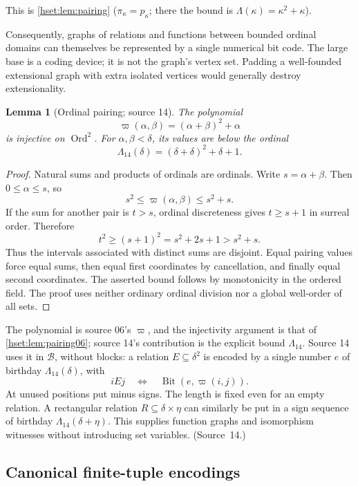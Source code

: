 \documentclass[11pt,letterpaper]{article}
\newtheorem{lemma}[lemma]{Lemma}\aliascntresetthe{lemma}
\theoremstyle{definition}
\theoremstyle{remark}
\newcommand{\Ord}{\operatorname{Ord}}
\newcommand{\B}{\mathcal B}
\newcommand{\Bit}{\operatorname{Bit}}
\begin{document}
This is \cref{hset:lem:pairing} ($\pi_\kappa=p_\kappa$; there the bound is
$\Lambda(\kappa)=\kappa^2+\kappa$).

Consequently, graphs of relations and functions between bounded ordinal domains
can themselves be represented by a single numerical bit code. The large base is a
coding device; it is not the graph's vertex set. Padding a well-founded
extensional graph with extra isolated vertices would generally destroy
extensionality.

\begin{lemma}[Ordinal pairing; source 14]\label{hset:sf:lem:pair}
The polynomial
\begin{equation}\label{hset:sf:eq:pair}
 \varpi(\alpha,\beta)=(\alpha+\beta)^2+\alpha
\end{equation}
is injective on $\Ord^2$. For $\alpha,\beta<\delta$, its values are below the
ordinal
\[
 \Lambda_{14}(\delta)=(\delta+\delta)^2+\delta+1.
\]
\end{lemma}
\begin{proof}
Natural sums and products of ordinals are ordinals. Write $s=\alpha+\beta$. Then
$0\le\alpha\le s$, so
\[
 s^2\le\varpi(\alpha,\beta)\le s^2+s.
\]
If the sum for another pair is $t>s$, ordinal discreteness gives $t\ge s+1$ in
surreal order. Therefore
\[
 t^2\ge(s+1)^2=s^2+2s+1>s^2+s.
\]
Thus the intervals associated with distinct sums are disjoint. Equal pairing
values force equal sums, then equal first coordinates by cancellation, and finally
equal second coordinates. The asserted bound follows by monotonicity in the
ordered field. The proof uses neither ordinary ordinal division nor a global
well-order of all sets.
\end{proof}

The polynomial is source 06's $\varpi$, and the injectivity argument is that of
\cref{hset:lem:pairing06}; source 14's contribution is the explicit bound
$\Lambda_{14}$. Source 14 uses it in $\B$, without blocks: a relation
$E\subseteq\delta^2$ is encoded by a single number $e$ of birthday
$\Lambda_{14}(\delta)$, with
\[
 iEj\quad\Longleftrightarrow\quad\Bit(e,\varpi(i,j)).
\]
At unused positions put minus signs. The length is fixed even for an empty
relation. A rectangular relation $R\subseteq\delta\times\eta$ can similarly be
put in a sign sequence of birthday $\Lambda_{14}(\delta+\eta)$. This supplies
function graphs and isomorphism witnesses without introducing set variables.
(Source~14.)

\subsection{Canonical finite-tuple encodings}\label{hset:sf:sub:tuple}
\end{document}
